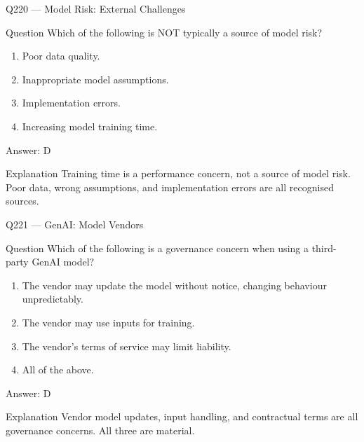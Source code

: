 \documentclass[aspectratio=169,8pt]{beamer}
\begin{document}
																											\begin{frame}{Q220 --- Model Risk: External Challenges}
																												\begin{block}{Question}
																													Which of the following is NOT typically a source of model risk?
																													\begin{enumerate}
																														\item Poor data quality.
																														\item Inappropriate model assumptions.
																														\item Implementation errors.
																														\item Increasing model training time.
																													\end{enumerate}  \end{block}
																													\begin{exampleblock}{Answer: D}\end{exampleblock}
																													\begin{block}{Explanation}
																														Training time is a performance concern, not a source of model risk. Poor data, wrong assumptions, and implementation errors are all recognised sources.
																													\end{block}
																												\end{frame}
																												
																												\begin{frame}{Q221 --- GenAI: Model Vendors}
																													\begin{block}{Question}
																														Which of the following is a governance concern when using a third-party GenAI model?
																														\begin{enumerate}
																															\item The vendor may update the model without notice, changing behaviour unpredictably.
																															\item The vendor may use inputs for training.
																															\item The vendor's terms of service may limit liability.
																															\item All of the above.
																														\end{enumerate}  \end{block}
																														\begin{exampleblock}{Answer: D}\end{exampleblock}
																														\begin{block}{Explanation}
																															Vendor model updates, input handling, and contractual terms are all governance concerns. All three are material.
																														\end{block}
																													\end{frame}
																													
\end{document}
